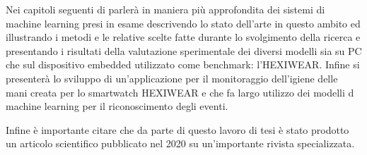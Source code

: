Nei capitoli seguenti di parlerà in maniera più approfondita dei sistemi di machine learning presi in esame descrivendo lo stato dell'arte in questo ambito ed illustrando i metodi e le relative scelte fatte 
durante lo svolgimento della ricerca e presentando i risultati della valutazione sperimentale dei diversi modelli sia su PC che sul dispositivo embedded utilizzato come benchmark: l'HEXIWEAR. Infine si presenterà lo sviluppo di un'applicazione per il monitoraggio dell'igiene delle mani creata per lo smartwatch HEXIWEAR e che fa largo utilizzo dei modelli d machine learning per il riconoscimento degli eventi.

Infine è importante citare che da parte di questo lavoro di tesi è stato prodotto un articolo scientifico pubblicato nel 2020 su un'importante rivista specializzata\cite{lattanzi2022unstructured}.
